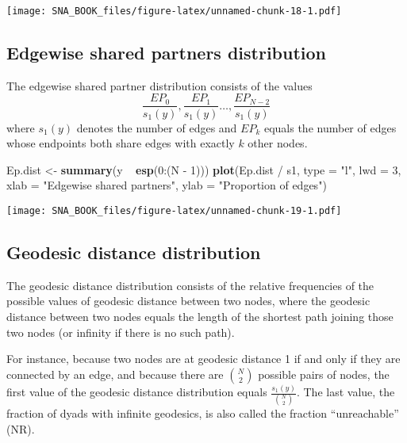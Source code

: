 \documentclass[]{book}
\newenvironment{Shaded}{\begin{snugshade}}{\end{snugshade}}
\newcommand{\KeywordTok}[1]{\textcolor[rgb]{0.13,0.29,0.53}{\textbf{{#1}}}}
\newcommand{\DataTypeTok}[1]{\textcolor[rgb]{0.13,0.29,0.53}{{#1}}}
\newcommand{\DecValTok}[1]{\textcolor[rgb]{0.00,0.00,0.81}{{#1}}}
\newcommand{\StringTok}[1]{\textcolor[rgb]{0.31,0.60,0.02}{{#1}}}
\newcommand{\NormalTok}[1]{{#1}}
\begin{document}
\texttt{[image: SNA\_BOOK\_files/figure-latex/unnamed-chunk-18-1.pdf]}

\subsection{Edgewise shared partners
distribution}\label{edgewise-shared-partners-distribution}

The edgewise shared partner distribution consists of the values
\[\frac{EP_0}{s_1(y)}, \frac{EP_1}{s_1(y)} \dots, \frac{EP_{N−2}}{s_1(y)}\]
where \(s_1(y)\) denotes the number of edges and \(EP_k\) equals the
number of edges whose endpoints both share edges with exactly \(k\)
other nodes.

\begin{Shaded}
\begin{Highlighting}[]
\NormalTok{Ep.dist <-}\StringTok{ }\KeywordTok{summary}\NormalTok{(y ~}\StringTok{ }\KeywordTok{esp}\NormalTok{(}\DecValTok{0}\NormalTok{:(N -}\StringTok{ }\DecValTok{1}\NormalTok{)))}
\KeywordTok{plot}\NormalTok{(Ep.dist /}\StringTok{ }\NormalTok{s1, }\DataTypeTok{type =} \StringTok{"l"}\NormalTok{, }\DataTypeTok{lwd =} \DecValTok{3}\NormalTok{,}
     \DataTypeTok{xlab =} \StringTok{"Edgewise shared partners"}\NormalTok{,}
     \DataTypeTok{ylab =} \StringTok{"Proportion of edges"}\NormalTok{)}
\end{Highlighting}
\end{Shaded}

\texttt{[image: SNA\_BOOK\_files/figure-latex/unnamed-chunk-19-1.pdf]}

\subsection{Geodesic distance
distribution}\label{geodesic-distance-distribution}

The geodesic distance distribution consists of the relative frequencies
of the possible values of geodesic distance between two nodes, where the
geodesic distance between two nodes equals the length of the shortest
path joining those two nodes (or infinity if there is no such path).

For instance, because two nodes are at geodesic distance 1 if and only
if they are connected by an edge, and because there are \(\binom{N}{2}\)
possible pairs of nodes, the first value of the geodesic distance
distribution equals \(\frac{s_1(y)}{\binom{N}{2}}\). The last value, the
fraction of dyads with infinite geodesics, is also called the fraction
``unreachable'' (NR).
\end{document}
